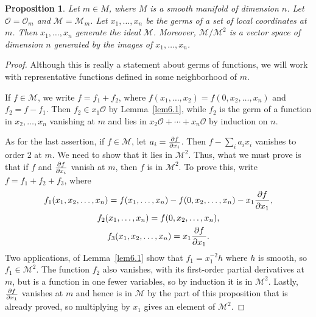 \documentclass[12pt,reqno]{book}%
\newtheorem{proposition}{Proposition}[chapter]
\theoremstyle{definition}
\theoremstyle{remark}
\theoremstyle{theorem}
\theoremstyle{remark}
\begin{document}
\begin{proposition}\label{prop6.1}%
    Let $m \in M$, where $M$ is a smooth manifold of dimension $n$.
    Let $\mathcal{O} = \mathcal{O}_m$ and $\mathcal{M} = \mathcal{M}_m$.
    Let $x_1, \ldots, x_n$ be the germs of a set of local coordinates at $m$.
    Then $x_1, \ldots, x_n$ generate the ideal $\mathcal{M}$.
    Moreover, $\mathcal{M}/\mathcal{M}^2$ is a vector space of dimension $n$ generated by the images of $x_1, \ldots, x_n$.
\end{proposition}%
\begin{proof}%
    Although this is really a statement about germs of functions, we will work with representative functions defined in some neighborhood of $m$.

    If $f \in \mathcal{M}$, we write $f = f_1 + f_2$, where $f(x_1, \ldots, x_2) = f(0, x_2, \ldots, x_n)$ and $f_2 = f - f_1$.
    Then $f_2 \in x_1\mathcal{O}$ by Lemma~\ref{lem6.1}, while $f_2$ is the germ of a function in $x_2, \ldots, x_n$ vanishing at $m$ and lies in $x_2\mathcal{O} + \cdots + x_n\mathcal{O}$ by induction on $n$.

    As for the last assertion, if $f \in \mathcal{M}$, let $a_i = \pdv{f}{x_i}(m)$.
    Then $f - \sum_{i}a_ix_i$ vanishes to order 2 at $m$.
    We need to show that it lies in $\mathcal{M}^2$.
    Thus, what we must prove is that if $f$ and $\pdv{f}{x_i}$ vanish at $m$, then $f$ is in $\mathcal{M}^2$.
    To prove this, write $f = f_1 + f_2 + f_3$, where
    \begin{gather*}
        f_1(x_1, x_2, \ldots, x_n) = f(x_1, \ldots, x_n) - f(0, x_2, \ldots, x_n) - x_1 \pdv{f}{x_1}(0, x_2, \ldots, x_n), \\
        f_2(x_1, \ldots, x_n) = f(0, x_2, \ldots, x_n), \\
        f_3(x_1, x_2, \ldots, x_n) = x_1 \pdv{f}{x_1}(0, x_2, \ldots, x_n).
    \end{gather*}
    Two applications, of Lemma~\ref{lem6.1} show that $f_1 = x_1^{-2}h$ where $h$ is smooth, so $f_1 \in \mathcal{M}^2$.
    The function $f_2$ also vanishes, with its first-order partial derivatives at $m$, but is a function in one fewer variables, so by induction it is in $\mathcal{M}^2$.
    Lastly, $\pdv{f}{x_1}$ vanishes at $m$ and hence is in $\mathcal{M}$ by the part of this proposition that is already proved, so multiplying by $x_1$ gives an element of $\mathcal{M}^2$.
\end{proof}%
\end{document}
